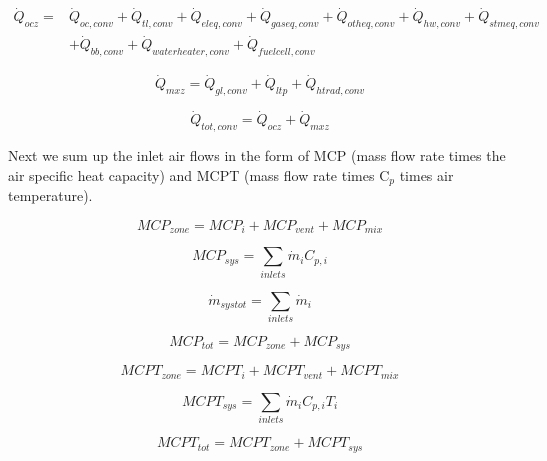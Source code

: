 \begin{equation}
\begin{split}
\dot Q_{ocz} =& \dot Q_{oc,conv} + \dot Q_{tl,conv} + \dot Q_{eleq,conv} + \dot Q_{gaseq,conv} + \dot Q_{otheq,conv} + \dot Q_{hw,conv} + \dot Q_{stmeq,conv} \\
&+ \dot Q_{bb,conv} + \dot Q_{waterheater,conv} + \dot Q_{fuelcell,conv}
\end{split}
\end{equation}

\begin{equation}
{\dot Q_{mxz}} = {\dot Q_{gl,conv}} + {\dot Q_{ltp}} + {\dot Q_{htrad,conv}}
\end{equation}

\begin{equation}
{\dot Q_{tot,conv}} = {\dot Q_{ocz}} + {\dot Q_{mxz}}
\end{equation}

Next we sum up the inlet air flows in the form of MCP (mass flow rate times the air specific heat capacity) and MCPT (mass flow rate times C\(_{p}\) times air temperature).

\begin{equation}
MC{P_{zone}} = MC{P_i} + MC{P_{vent}} + MC{P_{mix}}
\end{equation}

\begin{equation}
MCP_{sys} = \sum\limits_{inlets} {\dot m_i C_{p,i}}
\end{equation}

\begin{equation}
{\dot m_{systot}} = \sum\limits_{inlets} {{{\dot m}_i}}
\end{equation}

\begin{equation}
MC{P_{tot}} = MC{P_{zone}} + MC{P_{sys}}
\end{equation}

\begin{equation}
MCP{T_{zone}} = MCP{T_i} + MCP{T_{vent}} + MCP{T_{mix}}
\end{equation}

\begin{equation}
MCP{T_{sys}} = \sum\limits_{inlets} {{{\dot m}_i}} {C_{p,i}}{T_i}
\end{equation}

\begin{equation}
MCP{T_{tot}} = MCP{T_{zone}} + MCP{T_{sys}}
\end{equation}

